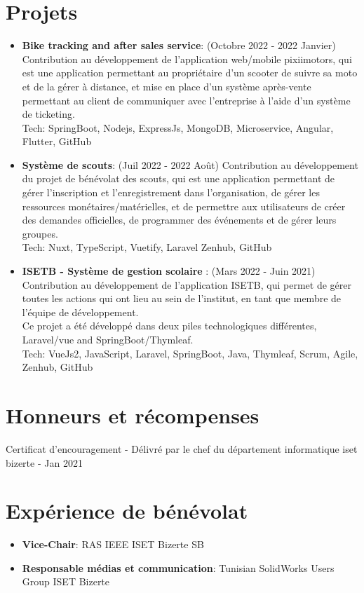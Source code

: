 \documentclass[a4paper,20pt]{article}
\newcommand{\resumeItem}[2]{
  \item\small{
    \textbf{#1}{: #2 \vspace{-2pt}}
  }
}
\newcommand{\resumeSubItem}[2]{\resumeItem{#1}{#2}\vspace{-3pt}}
\newcommand{\resumeSubHeadingListStart}{\begin{itemize}[leftmargin=*]}
\newcommand{\resumeSubHeadingListEnd}{\end{itemize}}
\begin{document}
\section{Projets}
\resumeSubHeadingListStart
\resumeSubItem{Bike tracking and after sales service}{(Octobre 2022 - 2022 Janvier)
Contribution au développement de l'application web/mobile pixiimotors, qui est une application permettant au propriétaire d'un scooter de suivre sa moto et de la gérer à distance, et mise en place d'un système après-vente permettant au client de communiquer avec l'entreprise à l'aide d'un système de ticketing.
\\ Tech: SpringBoot, Nodejs, ExpressJs, MongoDB, Microservice, Angular, Flutter, GitHub }
\vspace{2pt}
\resumeSubItem{Système de scouts}{(Juil 2022 - 2022 Août)
 Contribution au développement du projet de bénévolat des scouts, qui est une application permettant de gérer l'inscription et l'enregistrement dans l'organisation, de gérer les ressources monétaires/matérielles, et de permettre aux utilisateurs de créer des demandes officielles, de programmer des événements et de gérer leurs groupes.
\\ Tech: Nuxt, TypeScript, Vuetify, Laravel Zenhub, GitHub }
\vspace{2pt}
\resumeSubItem{ISETB - Système de gestion scolaire
 }{(Mars 2022 - Juin 2021) 
 Contribution au développement de l'application ISETB, qui permet de gérer toutes les actions qui ont lieu au sein de l'institut, en tant que membre de l'équipe de développement.
 \\\small{Ce projet a été développé dans deux piles technologiques différentes, Laravel/vue and SpringBoot/Thymleaf.}
\\ 
Tech: VueJs2, JavaScript, Laravel, SpringBoot, Java, Thymleaf, Scrum, Agile, Zenhub, GitHub }
\resumeSubHeadingListEnd

\section{Honneurs et récompenses}
\begin{description}[font=$\bullet$]
\item {Certificat d'encouragement - Délivré par le chef du département informatique iset bizerte - Jan 2021}
\end{description}

\vspace{-2pt}
\section{Expérience de bénévolat}
  \resumeSubHeadingListStart
	\resumeItem
    {Vice-Chair}
    {RAS IEEE ISET Bizerte SB}
    \resumeItem
    {Responsable médias et communication}
    {Tunisian SolidWorks
Users Group ISET Bizerte}
   
\vspace{5pt}
\resumeSubHeadingListEnd
\end{document}
